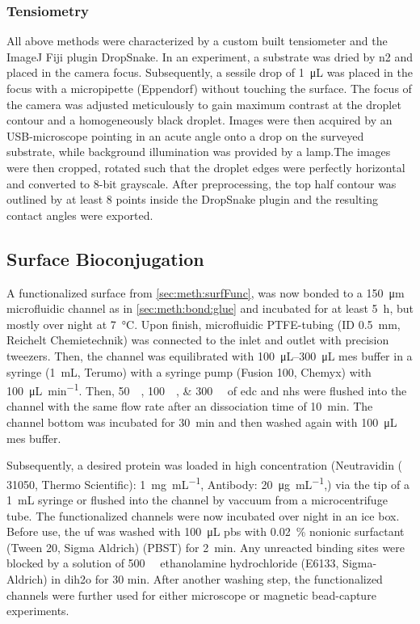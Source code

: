 \subsubsection{Tensiometry}
All above methods were characterized by a custom built tensiometer and the ImageJ Fiji plugin DropSnake. \cite{lit:chem:Fiji,lit:chem:surfaceTension}
In an experiment, a substrate was dried by \gls{n2} and placed in the camera focus. Subsequently, a sessile drop of \SI{1}{\micro\liter} was placed in the focus with a micropipette (Eppendorf) without touching the surface. The focus of the camera was adjusted meticulously to gain maximum contrast at the droplet contour and a homogeneously black droplet. Images were then acquired by an USB-microscope 
pointing in an acute angle onto a drop on the surveyed substrate, while background illumination was provided by a lamp.The images were then cropped, rotated such that the droplet edges were perfectly horizontal and converted to 8-bit grayscale. After preprocessing, the top half contour was outlined by at least 8 points inside the DropSnake plugin and the resulting contact angles were exported.

\subsection{Surface Bioconjugation}
\label{sec:meth:surfBio}
A functionalized surface from \ref{sec:meth:surfFunc}, was now bonded to a \SI{150}{\micro\meter} microfluidic channel as in \ref{sec:meth:bond:glue} and incubated for at least \SI{5}{\hour}, but mostly over night at \SI{7}{\degreeCelsius}. Upon finish, microfluidic PTFE-tubing (ID \SI{0.5}{\milli\meter}, Reichelt Chemietechnik) was connected to the inlet and outlet with precision tweezers. Then, the channel was equilibrated with \SIrange{100}{300}{\micro\liter} \gls{mes} buffer in a syringe (\SI{1}{\milli\liter}, Terumo) with a syringe pump (Fusion 100, Chemyx) with \SI{100}{\micro\liter\per\minute}. Then, \SIlist{50;100;300}{\milli\molar} of \gls{edc} and \gls{nhs} were flushed into the channel with the same flow rate after an dissociation time of \SI{10}{\minute}. The channel bottom was incubated for \SI{30}{\minute} and then washed again with \SI{100}{\micro\liter} \gls{mes} buffer. 

Subsequently, a desired protein was loaded in high concentration (Neutravidin ( 31050, Thermo Scientific): \SI{1}{\milli\gram\per\milli\liter}, Antibody: \SI{20}{\micro\gram\per\milli\liter},) via the tip of a \SI{1}{\milli\liter} syringe or flushed into the channel by vaccuum from a microcentrifuge tube. The functionalized channels were now incubated over night in an ice box. Before use, the \gls{uf} was washed with \SI{100}{\micro\liter} \gls{pbs} with \SI{0.02}{\percent} nonionic surfactant (Tween 20, Sigma Aldrich) (PBST) for \SI{2}{\minute}. Any unreacted binding sites were blocked by a solution of \SI{500}{\milli\molar} ethanolamine hydrochloride (E6133, Sigma-Aldrich) in \gls{dih2o} for 30 min. After another washing step, the functionalized channels were further used for either microscope or magnetic bead-capture experiments.


